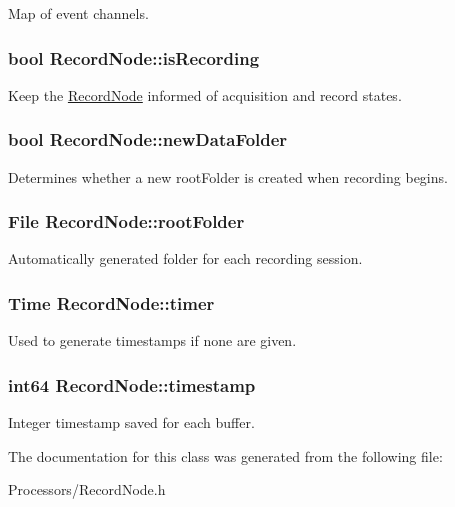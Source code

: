 Map of event channels. \hypertarget{classRecordNode_a70adffca8ea1721773c80ad6c4a844e1}{
\subsubsection[{is\-Recording}]{\setlength{\rightskip}{0pt plus 5cm}bool Record\-Node\-::is\-Recording\hspace{0.3cm}{\ttfamily [private]}}}\label{classRecordNode_a70adffca8ea1721773c80ad6c4a844e1}
Keep the \hyperlink{classRecordNode}{Record\-Node} informed of acquisition and record states. \hypertarget{classRecordNode_abc8b3b93a3912fa0c0ed6438508a7c78}{
\subsubsection[{new\-Data\-Folder}]{\setlength{\rightskip}{0pt plus 5cm}bool Record\-Node\-::new\-Data\-Folder\hspace{0.3cm}{\ttfamily [private]}}}\label{classRecordNode_abc8b3b93a3912fa0c0ed6438508a7c78}
Determines whether a new root\-Folder is created when recording begins. \hypertarget{classRecordNode_a6b6bbb72fc226f1de138175d575e62e1}{
\subsubsection[{root\-Folder}]{\setlength{\rightskip}{0pt plus 5cm}File Record\-Node\-::root\-Folder\hspace{0.3cm}{\ttfamily [private]}}}\label{classRecordNode_a6b6bbb72fc226f1de138175d575e62e1}
Automatically generated folder for each recording session. \hypertarget{classRecordNode_a406bc13e786db7c14f1cd8b183ebc0e0}{
\subsubsection[{timer}]{\setlength{\rightskip}{0pt plus 5cm}Time Record\-Node\-::timer\hspace{0.3cm}{\ttfamily [private]}}}\label{classRecordNode_a406bc13e786db7c14f1cd8b183ebc0e0}
Used to generate timestamps if none are given. \hypertarget{classRecordNode_a154d4c809090e282cdd99098c0d701c9}{
\subsubsection[{timestamp}]{\setlength{\rightskip}{0pt plus 5cm}int64 Record\-Node\-::timestamp\hspace{0.3cm}{\ttfamily [private]}}}\label{classRecordNode_a154d4c809090e282cdd99098c0d701c9}
Integer timestamp saved for each buffer. 

The documentation for this class was generated from the following file\-:\begin{DoxyCompactItemize}
\item 
Processors/Record\-Node.\-h\end{DoxyCompactItemize}
